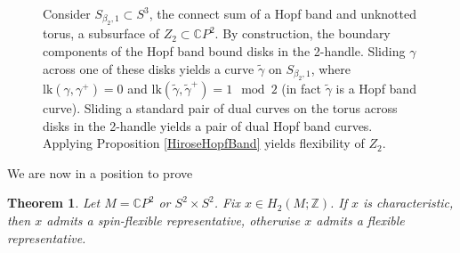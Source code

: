\documentclass[10pt]{amsart}
\numberwithin{equation}{section}
\theoremstyle{plain}
\newtheorem{maintheorem}{Theorem}
\theoremstyle{definition}
\theoremstyle{remark}
\begin{document}
\begin{figure}
  \centering
  \def\svgwidth{0.55\columnwidth}
  
  \caption{\textnormal{Consider $S_{\beta_2,1}\subset S^3$, the connect sum of a Hopf band and unknotted torus, a subsurface of $Z_2 \subset \mathbb{C}P^2$. By construction, the boundary components of the Hopf band bound disks in the 2-handle. Sliding  $\gamma$ across one of these disks yields a curve $\widetilde{\gamma}$ on $S_{\beta_2,1}$, where $\mathrm{lk}(\gamma,\gamma^+)  = 0$ and $\mathrm{lk}(\widetilde{\gamma},\widetilde{\gamma}^+) = 1 \mod 2$ (in fact $\widetilde{\gamma}$ is a Hopf band curve).  Sliding a standard pair of dual curves on the torus across disks in the 2-handle yields a pair of dual Hopf band curves. Applying Proposition \ref{HiroseHopfBand} yields flexibility of $Z_2$}. }
  \label{slide}
\end{figure}


We are now in a position to prove 



\setcounter{maintheorem}{0}
\begin{maintheorem} \label{thmA}
Let $M = \mathbb{C}P^2$ or $S^2 \times S^2$. Fix $x \in H_2(M;\mathbb{Z})$. If $x$ is characteristic, then $x$ admits a spin-flexible representative, otherwise $x$ admits a flexible representative. 
\end{maintheorem}
\end{document}
